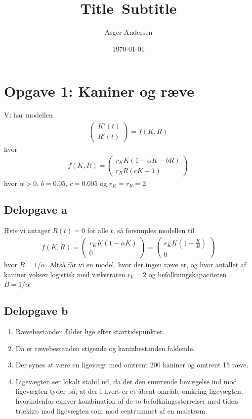 \documentclass[12pt]{article}
\title{
  Title\
  \large Subtitle
}
\author{Asger Andersen}
\date{\today}
\begin{document}
\section{Opgave 1: Kaniner og ræve}

Vi har modellen
\begin{align}
\begin{pmatrix}
K'(t) \\ 
R'(t)
\end{pmatrix} = f(K, R)
\end{align}
hvor 
\begin{align}
f(K,R) = \begin{pmatrix}
r_K K (1 - \alpha K - bR) \\ 
r_R R (cK - 1)
\end{pmatrix}
\end{align}
hvor $\alpha>0$, $b=0.05$, $c=0.005$ og $r_K = r_R = 2$.

\subsection{Delopgave a}

Hvis vi antager $R(t)=0$ for alle $t$, så forsimples modellen til
\begin{align}
f(K,R) = \begin{pmatrix}
r_K K (1 - \alpha K) \\ 
0
\end{pmatrix} = \begin{pmatrix}
r_K K \left(1 - \frac{K}{B}\right) \\ 
0
\end{pmatrix} 
\end{align}
hvor $B=1/\alpha$. Altså får vi en model, hvor der ingen ræve er, og hvor antallet af kaniner vokser logistisk med vækstraten $r_k=2$ og befolkningskapaciteten $B=1/\alpha$.

\subsection{Delopgave b}

\begin{enumerate}
\item Rævebestanden falder lige efter starttidspunktet.
\item Da er rævebestanden stigende og kaninbestanden faldende.
\item Der synes at være en ligevægt med omtrent 200 kaniner og omtrent 15 ræve.
\item Ligevægten ser lokalt stabil ud, da det den snurrende bevægelse ind mod ligevægten tyder på, at der i hvert er et åbent område omkring ligevægten, hvorindenfor enhver kombination af de to befolkningsstørrelser med tiden trækkes mod ligevægten som mod centrummet af en malstrøm.
\end{enumerate}
\end{document}
